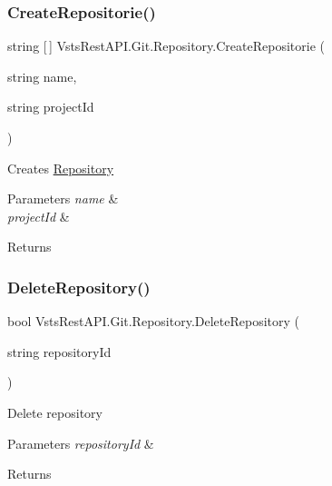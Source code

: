 \subsubsection{\texorpdfstring{Create\+Repositorie()}{CreateRepositorie()}}
{\footnotesize\ttfamily string \mbox{[}$\,$\mbox{]} Vsts\+Rest\+A\+P\+I.\+Git.\+Repository.\+Create\+Repositorie (\begin{DoxyParamCaption}\item[{string}]{name,  }\item[{string}]{project\+Id }\end{DoxyParamCaption})}



Creates \mbox{\hyperlink{class_vsts_rest_a_p_i_1_1_git_1_1_repository}{Repository}} 


\begin{DoxyParams}{Parameters}
{\em name} & \\
\hline
{\em project\+Id} & \\
\hline
\end{DoxyParams}
\begin{DoxyReturn}{Returns}

\end{DoxyReturn}
\mbox{\label{class_vsts_rest_a_p_i_1_1_git_1_1_repository_ae9bdfeecb8846a51d3900752166d6d74}} 
\subsubsection{\texorpdfstring{Delete\+Repository()}{DeleteRepository()}}
{\footnotesize\ttfamily bool Vsts\+Rest\+A\+P\+I.\+Git.\+Repository.\+Delete\+Repository (\begin{DoxyParamCaption}\item[{string}]{repository\+Id }\end{DoxyParamCaption})}



Delete repository 


\begin{DoxyParams}{Parameters}
{\em repository\+Id} & \\
\hline
\end{DoxyParams}
\begin{DoxyReturn}{Returns}

\end{DoxyReturn}
\mbox{\label{class_vsts_rest_a_p_i_1_1_git_1_1_repository_a6cf8983ffb2539bb9d3d5eb2a1657c28}} 
